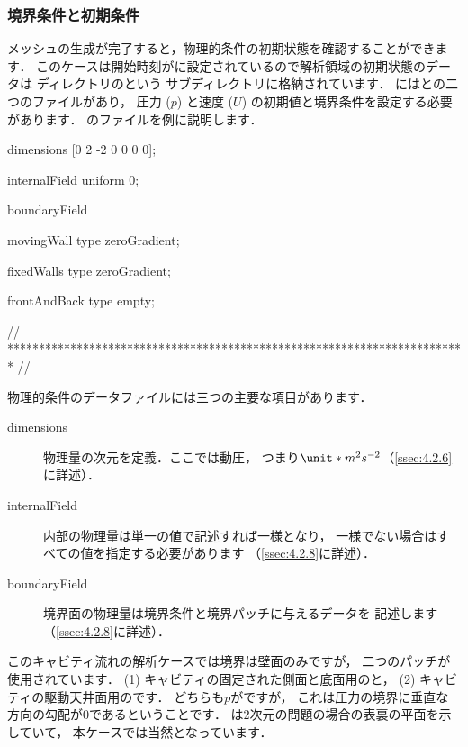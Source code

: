 \subsubsection{境界条件と初期条件}
\label{sssec:2.1.1.2}
メッシュの生成が完了すると，物理的条件の初期状態を確認することができます．
このケースは開始時刻がに設定されているので解析領域の初期状態のデータは
ディレクトリのという
サブディレクトリに格納されています．
にはとの二つのファイルがあり，
圧力 ($p$) と速度 ($U$) の初期値と境界条件を設定する必要があります．
のファイルを例に説明します．
\begin{OFverbatim}[file, linenum=17]
dimensions      [0 2 -2 0 0 0 0];

internalField   uniform 0;

boundaryField
{
    movingWall
    {
        type            zeroGradient;
    }

    fixedWalls
    {
        type            zeroGradient;
    }

    frontAndBack
    {
        type            empty;
    }
}

// ************************************************************************* //
\end{OFverbatim}
物理的条件のデータファイルには三つの主要な項目があります．
\begin{description}
 \item[dimensions]
%
%
            物理量の次元を定義．ここでは動圧，
            つまり$\unit*{m^{2}s^{-2}}$（\autoref{ssec:4.2.6}に詳述）．
 \item[internalField]
%
%
            内部の物理量は単一の値で記述すれば一様となり，
            一様でない場合はすべての値を指定する必要があります
            （\autoref{ssec:4.2.8}に詳述）．
 \item[boundaryField]
%
%
            境界面の物理量は境界条件と境界パッチに与えるデータを
            記述します（\autoref{ssec:4.2.8}に詳述）．
\end{description}
このキャビティ流れの解析ケースでは境界は壁面のみですが，
二つのパッチが使用されています．
(1) キャビティの固定された側面と底面用のと，
(2) キャビティの駆動天井面用のです．
どちらも$p$がですが，
これは圧力の境界に垂直な方向の勾配が$0$であるということです．
は2次元の問題の場合の表裏の平面を示していて，
本ケースでは当然となっています．

